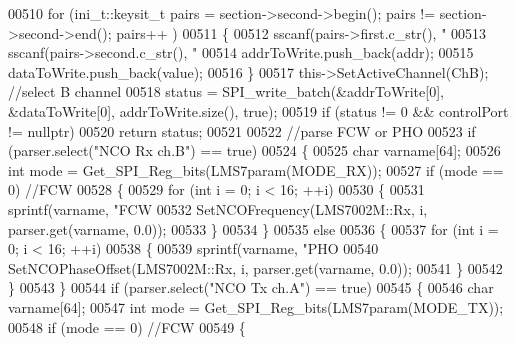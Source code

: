 \begin{DoxyCode}
{{{{{{{{00510             \textcolor{keywordflow}{for} (ini\_t::keysit\_t pairs = section->second->begin(); pairs != section->second->end(); pairs++
      )
00511             \{
00512                 sscanf(pairs->first.c\_str(), \textcolor{stringliteral}{"%
00513                 sscanf(pairs->second.c\_str(), \textcolor{stringliteral}{"%
00514                 addrToWrite.push\_back(addr);
00515                 dataToWrite.push\_back(value);
00516             \}
00517             this->SetActiveChannel(ChB); \textcolor{comment}{//select B channel}
00518             status = SPI_write_batch(&addrToWrite[0], &dataToWrite[0], addrToWrite.size(), \textcolor{keyword}{true});
00519             \textcolor{keywordflow}{if} (status != 0 && controlPort != \textcolor{keyword}{nullptr})
00520                 \textcolor{keywordflow}{return} status;
00521 
00522             \textcolor{comment}{//parse FCW or PHO}
00523             \textcolor{keywordflow}{if} (parser.select(\textcolor{stringliteral}{"NCO Rx ch.B"}) == \textcolor{keyword}{true})
00524             \{
00525                 \textcolor{keywordtype}{char} varname[64];
00526                 \textcolor{keywordtype}{int} mode = Get_SPI_Reg_bits(LMS7param(MODE_RX));
00527                 \textcolor{keywordflow}{if} (mode == 0) \textcolor{comment}{//FCW}
00528                 \{
00529                     \textcolor{keywordflow}{for} (\textcolor{keywordtype}{int} i = 0; i < 16; ++i)
00530                     \{
00531                         sprintf(varname, \textcolor{stringliteral}{"FCW%
00532                         SetNCOFrequency(LMS7002M::Rx, i, parser.get(varname, 0.0));
00533                     \}
00534                 \}
00535                 \textcolor{keywordflow}{else}
00536                 \{
00537                     \textcolor{keywordflow}{for} (\textcolor{keywordtype}{int} i = 0; i < 16; ++i)
00538                     \{
00539                         sprintf(varname, \textcolor{stringliteral}{"PHO%
00540                         SetNCOPhaseOffset(LMS7002M::Rx, i, parser.get(varname, 0.0));
00541                     \}
00542                 \}
00543             \}
00544             \textcolor{keywordflow}{if} (parser.select(\textcolor{stringliteral}{"NCO Tx ch.A"}) == \textcolor{keyword}{true})
00545             \{
00546                 \textcolor{keywordtype}{char} varname[64];
00547                 \textcolor{keywordtype}{int} mode = Get_SPI_Reg_bits(LMS7param(MODE_TX));
00548                 \textcolor{keywordflow}{if} (mode == 0) \textcolor{comment}{//FCW}
00549                 \{
}}}}}}}}}}}}
\end{DoxyCode}
